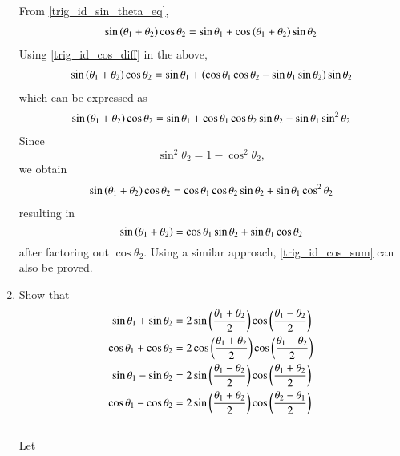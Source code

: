 \begin{enumerate}[label=\thesubsection.\arabic*.,ref=\thesubsection.\theenumi]
%
\solution From \eqref{trig_id_sin_theta_eq},
%
\begin{align}
 \sin \left(\theta_1 + \theta_2\right)\cos \theta_2 =\sin  \theta_1 +\cos\left(\theta_1+\theta_2\right)\sin\theta_2 
\end{align}
%
Using \eqref{trig_id_cos_diff} in the above,
%
\begin{align}
\sin \left(\theta_1 + \theta_2\right)\cos \theta_2 
=\sin  \theta_1 +\left(\cos \theta_1\cos\theta_2 
	- \sin \theta_1\sin\theta_2\right)\sin\theta_2 
\end{align}
%
which can be expressed as
%
\begin{align}
\sin \left(\theta_1 + \theta_2\right)\cos \theta_2 
=\sin  \theta_1 
+\cos \theta_1\cos\theta_2 \sin\theta_2 
		- \sin \theta_1\sin^2\theta_2
\end{align}
%
Since
%
\begin{equation}
\sin^2\theta_2 = 1- \cos^2\theta_2, 
\end{equation}
%
we obtain
%
\begin{align}
\sin \left(\theta_1 + \theta_2\right)\cos \theta_2 
=\cos \theta_1\cos\theta_2 \sin\theta_2 
+ \sin \theta_1\cos^2\theta_2
\end{align}
%
resulting in
%
\begin{equation}
\sin \left(\theta_1 + \theta_2\right)
=\cos \theta_1 \sin\theta_2 
+ \sin \theta_1\cos\theta_2
\end{equation}
%
after factoring out $\cos \theta_2$.  Using a similar approach, \eqref{trig_id_cos_sum} can also be proved.
\item Show that 
\begin{align}
\label{eq:trig_id_sum_diff1}
\sin \theta_1 + \sin \theta_2 &= 2\sin\left(\frac{\theta_1+\theta_2}{2}\right)\cos\left(\frac{\theta_1-\theta_2}{2}\right)
\\
\label{eq:trig_id_sum_diff2}
\cos \theta_1 + \cos \theta_2 &= 2\cos\left(\frac{\theta_1+\theta_2}{2}\right)\cos\left(\frac{\theta_1-\theta_2}{2}\right)
\\
\label{eq:trig_id_sum_diff3}
\sin \theta_1 - \sin \theta_2 &= 2\sin\left(\frac{\theta_1-\theta_2}{2}\right)\cos\left(\frac{\theta_1+\theta_2}{2}\right)
\\
\label{eq:trig_id_sum_diff4}
\cos \theta_1 - \cos \theta_2 &= 2\sin\left(\frac{\theta_1+\theta_2}{2}\right)\cos\left(\frac{\theta_2-\theta_1}{2}\right)
\end{align}
%
\\
\solution Let 
%
\begin{align}
\label{eq:trig_id_ang_sum_diff}
\begin{split}

\end{split}
\end{align}
\end{enumerate}
